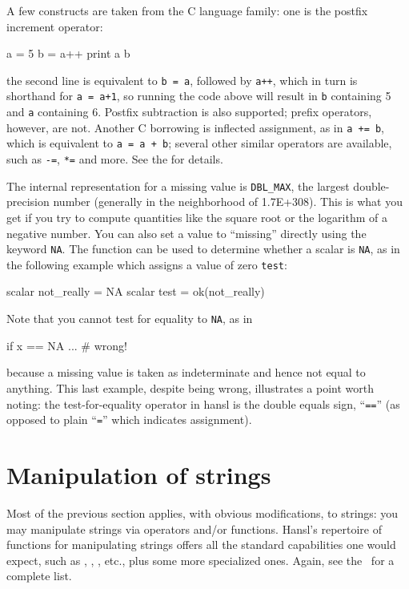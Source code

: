 A few constructs are taken from the C language family: one is the
postfix increment operator:
\begin{code}
  a = 5
  b = a++
  print a b
\end{code}
the second line is equivalent to \texttt{b = a}, followed by
\texttt{a++}, which in turn is shorthand for \texttt{a = a+1}, so
running the code above will result in \texttt{b} containing 5 and
\texttt{a} containing 6. Postfix subtraction is also supported; prefix
operators, however, are not. Another C borrowing is inflected
assignment, as in \texttt{a += b}, which is equivalent to \texttt{a =
  a + b}; several other similar operators are available, such as
\texttt{-=}, \texttt{*=} and more. See the \GCR{} for details.

The internal representation for a missing value is \texttt{DBL\_MAX},
the largest double-precision number (generally in the neighborhood of
1.7E+308). This is what you get if you try to compute quantities like
the square root or the logarithm of a negative number. You can also
set a value to ``missing'' directly using the keyword \texttt{NA}.
The function  can be used to determine whether a scalar is
\texttt{NA}, as in the following example which assigns a value of zero
\texttt{test}:
\begin{code}
  scalar not_really = NA
  scalar test = ok(not_really)
\end{code}
Note that you cannot test for equality to \texttt{NA}, as in
\begin{code}
  if x == NA ... # wrong!
\end{code}
because a missing value is taken as indeterminate and hence not equal
to anything. This last example, despite being wrong, illustrates a
point worth noting: the test-for-equality operator in hansl is the
double equals sign, ``\texttt{==}'' (as opposed to plain
``\texttt{=}'' which indicates assignment).

\section{Manipulation of strings}

Most of the previous section applies, with obvious modifications, to
strings: you may manipulate strings via operators and/or
functions. Hansl's repertoire of functions for manipulating strings
offers all the standard capabilities one would expect, such as
, , , etc., plus some more
specialized ones. Again, see the \GCR\ for a complete list.

